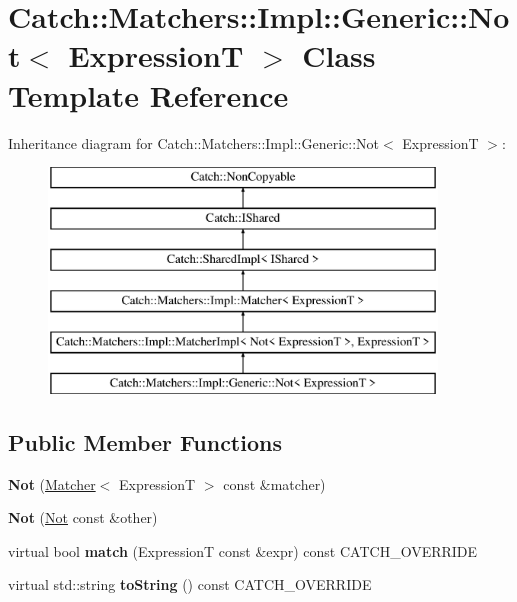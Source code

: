 \hypertarget{classCatch_1_1Matchers_1_1Impl_1_1Generic_1_1Not}{}\section{Catch\+:\+:Matchers\+:\+:Impl\+:\+:Generic\+:\+:Not$<$ ExpressionT $>$ Class Template Reference}
\label{classCatch_1_1Matchers_1_1Impl_1_1Generic_1_1Not}
Inheritance diagram for Catch\+:\+:Matchers\+:\+:Impl\+:\+:Generic\+:\+:Not$<$ ExpressionT $>$\+:\begin{figure}[H]
\begin{center}
\leavevmode
\includegraphics[height=6.000000cm]{classCatch_1_1Matchers_1_1Impl_1_1Generic_1_1Not}
\end{center}
\end{figure}
\subsection*{Public Member Functions}
\begin{DoxyCompactItemize}
\item 
{\bfseries Not} (\hyperlink{structCatch_1_1Matchers_1_1Impl_1_1Matcher}{Matcher}$<$ ExpressionT $>$ const \&matcher)\hypertarget{classCatch_1_1Matchers_1_1Impl_1_1Generic_1_1Not_a9b99e3ce49c1a16931708b67c312f204}{}\label{classCatch_1_1Matchers_1_1Impl_1_1Generic_1_1Not_a9b99e3ce49c1a16931708b67c312f204}

\item 
{\bfseries Not} (\hyperlink{classCatch_1_1Matchers_1_1Impl_1_1Generic_1_1Not}{Not} const \&other)\hypertarget{classCatch_1_1Matchers_1_1Impl_1_1Generic_1_1Not_a46eccbbaeec259d3536aa2a29f95208f}{}\label{classCatch_1_1Matchers_1_1Impl_1_1Generic_1_1Not_a46eccbbaeec259d3536aa2a29f95208f}

\item 
virtual bool {\bfseries match} (ExpressionT const \&expr) const C\+A\+T\+C\+H\+\_\+\+O\+V\+E\+R\+R\+I\+DE\hypertarget{classCatch_1_1Matchers_1_1Impl_1_1Generic_1_1Not_a18c49fc6fb73a42d54650dafc18c7db1}{}\label{classCatch_1_1Matchers_1_1Impl_1_1Generic_1_1Not_a18c49fc6fb73a42d54650dafc18c7db1}

\item 
virtual std\+::string {\bfseries to\+String} () const C\+A\+T\+C\+H\+\_\+\+O\+V\+E\+R\+R\+I\+DE\hypertarget{classCatch_1_1Matchers_1_1Impl_1_1Generic_1_1Not_ab970a4a6e58a987451e0b0e0e60a0bff}{}\label{classCatch_1_1Matchers_1_1Impl_1_1Generic_1_1Not_ab970a4a6e58a987451e0b0e0e60a0bff}

\end{DoxyCompactItemize}
